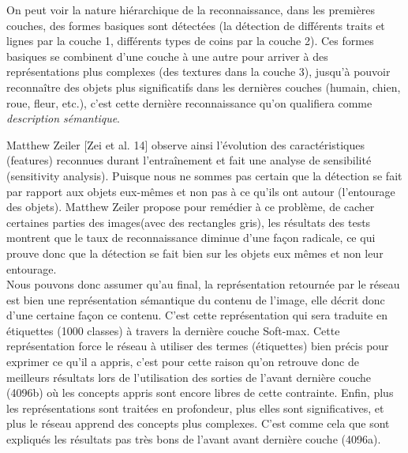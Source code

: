 	On peut voir la nature hiérarchique de la reconnaissance, dans les premières couches, des formes basiques sont détectées (la détection de différents traits et lignes par la couche 1, différents types de coins par la couche 2). Ces formes basiques se combinent d'une couche à une autre pour arriver à des représentations plus complexes (des textures dans la couche 3), jusqu’à pouvoir reconnaître des objets plus significatifs dans les dernières couches (humain, chien, roue, fleur, etc.), c'est cette dernière reconnaissance qu'on qualifiera comme \textit{description sémantique}.

	Matthew Zeiler [Zei et al. 14] observe ainsi l’évolution des caractéristiques (features) reconnues durant l’entraînement et fait une analyse de sensibilité (sensitivity analysis). Puisque nous ne sommes pas certain que la détection se fait par rapport aux objets eux-mêmes et non pas à ce qu'ils ont autour (l'entourage des objets). Matthew Zeiler propose pour remédier à ce problème, de cacher certaines parties des images(avec des rectangles gris), les résultats des tests montrent que le taux de reconnaissance diminue d'une façon radicale, ce qui prouve donc que la détection se fait bien sur les objets eux mêmes et non leur entourage.\\

	Nous pouvons donc assumer qu'au final, la représentation retournée par le réseau est bien une représentation sémantique du contenu de l'image, elle décrit donc d'une certaine façon ce contenu. C'est cette représentation qui sera traduite en étiquettes (1000 classes) à travers la dernière couche Soft-max. Cette représentation force le réseau à utiliser des termes (étiquettes) bien précis pour exprimer ce qu'il a appris, c'est pour cette raison qu'on retrouve donc de meilleurs résultats lors de l'utilisation des sorties de l'avant dernière couche (4096b) où les concepts appris sont encore libres de cette contrainte. Enfin, plus les représentations sont traitées en profondeur, plus elles sont significatives, et plus le réseau apprend des concepts plus complexes. C'est comme cela que sont expliqués les résultats pas très bons de l'avant avant dernière couche (4096a).

